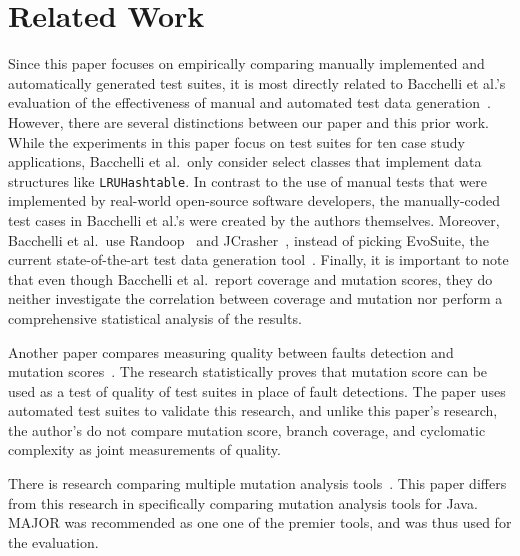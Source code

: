 
\section{Related Work} \label{sec:related_work}

Since this paper focuses on empirically comparing manually implemented and automatically generated test suites, it is most directly related to Bacchelli et al.'s evaluation of the effectiveness of manual and automated test data generation~\cite{bacchelli2008}. However, there are several distinctions between our paper and this prior work. While the experiments in this paper focus on test suites for ten case study applications, Bacchelli et al.\ only consider select classes that implement data structures like {\tt LRUHashtable}. In contrast to the use of manual tests that were implemented by real-world open-source software developers, the manually-coded test cases in Bacchelli et al.'s were created by the authors themselves.  Moreover, Bacchelli et al.\ use Randoop~\cite{pacheco2007feedback} and JCrasher~\cite{csallner2004}, instead of picking EvoSuite, the current state-of-the-art test data generation tool~\cite{fraser2013a}. Finally, it is important to note that even though Bacchelli et al.\ report coverage and mutation scores, they do neither investigate the correlation between coverage and mutation nor perform a comprehensive statistical analysis of the results.


Another paper compares measuring quality between faults detection and mutation scores~\cite{just2014}. The research statistically proves that mutation score can be used as a test of quality of test suites in place of fault detections.  The paper uses automated test suites to validate this research, and unlike this paper's research, the author's do not compare mutation score, branch coverage, and cyclomatic complexity as joint measurements of quality. 

There is research comparing multiple mutation analysis tools~\cite{ComparingAutomatedMutationTools:2013}. This paper differs from this research in specifically comparing mutation analysis tools for Java. MAJOR was recommended as one one of the premier tools, and was thus used for the evaluation.
